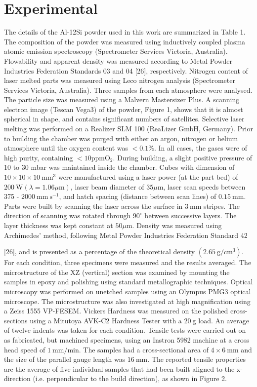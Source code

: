 \documentclass[10pt]{article}
\begin{document}
\section*{Experimental}
The details of the Al-12Si powder used in this work are summarized in Table 1. The composition of the powder was measured using inductively coupled plasma atomic emission spectroscopy (Spectrometer Services Victoria, Australia). Flowability and apparent density was measured according to Metal Powder Industries Federation Standards 03 and 04 [26], respectively. Nitrogen content of laser melted parts was measured using Leco nitrogen analysis (Spectrometer Services Victoria, Australia). Three samples from each atmosphere were analysed. The particle size was measured using a Malvern Mastersizer Plus. A scanning electron image (Tescan Vega3) of the powder, Figure 1, shows that it is almost spherical in shape, and contains significant numbers of satellites. Selective laser melting was performed on a Realizer SLM 100 (ReaLizer GmbH, Germany). Prior to building the chamber was purged with either an argon, nitrogen or helium atmosphere until the oxygen content was $<0.1 \%$. In all cases, the gases were of high purity, containing $<10 \mathrm{ppm} \mathrm{O}_{2}$. During building, a slight positive pressure of 10 to 30 mbar was maintained inside the chamber. Cubes with dimension of $10 \times 10 \times 10 \mathrm{~mm}^{3}$ were manufactured using a laser power (at the part bed) of $200 \mathrm{~W}(\lambda=1.06 \mu \mathrm{m})$, laser beam diameter of $35 \mu \mathrm{m}$, laser scan speeds between 375 - $2000 \mathrm{~mm} \mathrm{~s}^{-1}$, and hatch spacing (distance between scan lines) of $0.15 \mathrm{~mm}$. Parts were built by scanning the laser across the surface in $3 \mathrm{~mm}$ stripes. The direction of scanning was rotated through $90^{\circ}$ between successive layers. The layer thickness was kept constant at $50 \mu \mathrm{m}$. Density was measured using Archimedes’ method, following Metal Powder Industries Federation Standard 42

[26], and is presented as a percentage of the theoretical density $\left(2.65 \mathrm{~g} / \mathrm{cm}^{3}\right)$. For each condition, three specimens were measured and the results averaged. The microstructure of the XZ (vertical) section was examined by mounting the samples in epoxy and polishing using standard metallographic techniques. Optical microscopy was performed on unetched samples using an Olympus PMG3 optical microscope. The microstructure was also investigated at high magnification using a Zeiss 1555 VP-FESEM. Vickers Hardness was measured on the polished cross-sections using a Mitutoya AVK-C2 Hardness Tester with a $20 \mathrm{~g}$ load. An average of twelve indents was taken for each condition. Tensile tests were carried out on as fabricated, but machined specimens, using an Instron 5982 machine at a cross head speed of $1 \mathrm{~mm} / \mathrm{min}$. The samples had a cross-sectional area of $4 \times 6 \mathrm{~mm}$ and the size of the parallel gauge length was $16 \mathrm{~mm}$. The reported tensile properties are the average of five individual samples that had been built aligned to the $\mathrm{x}$-direction (i.e. perpendicular to the build direction), as shown in Figure 2.
\end{document}
